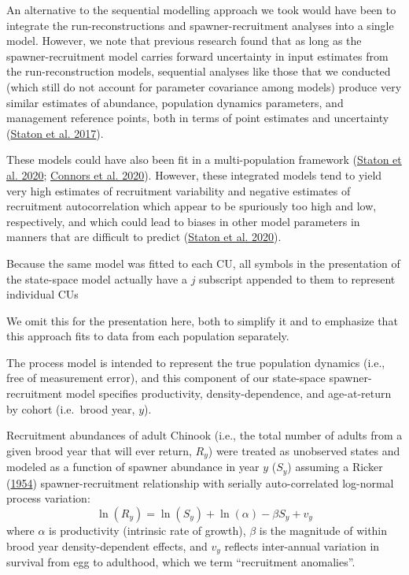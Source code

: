 \documentclass[11pt]{book}
\begin{document}
An alternative to the sequential modelling approach we took would have been to integrate the run-reconstructions and spawner-recruitment analyses into a single model. However, we note that previous research found that as long as the spawner-recruitment model carries forward uncertainty in input estimates from the run-reconstruction models, sequential analyses like those that we conducted (which still do not account for parameter covariance among models) produce very similar estimates of abundance, population dynamics parameters, and management reference points, both in terms of point estimates and uncertainty (\protect\hyperlink{ref-staton-etal-2017}{Staton et al. 2017}).

These models could have also been fit in a multi-population framework (\protect\hyperlink{ref-staton-etal-2020}{Staton et al. 2020}; \protect\hyperlink{ref-connors_incorporating_2020}{Connors et al. 2020}). However, these integrated models tend to yield very high estimates of recruitment variability and negative estimates of recruitment autocorrelation which appear to be spuriously too high and low, respectively, and which could lead to biases in other model parameters in manners that are difficult to predict (\protect\hyperlink{ref-staton-etal-2020}{Staton et al. 2020}).

Because the same model was fitted to each CU, all symbols in the presentation of the state-space model actually have a \(j\) subscript appended to them to represent individual CUs

We omit this for the presentation here, both to simplify it and to emphasize that this approach fits to data from each population separately.

\hypertarget{process-model}{%
\label{process-model}}

The process model is intended to represent the true population dynamics (i.e., free of measurement error), and this component of our state-space spawner-recruitment model specifies productivity, density-dependence, and age-at-return by cohort (i.e.~brood year, \(y\)).

Recruitment abundances of adult Chinook (i.e., the total number of adults from a given brood year that will ever return, \(R_y\)) were treated as unobserved states and modeled as a function of spawner abundance in year \(y\) (\(S_y\)) assuming a Ricker (\protect\hyperlink{ref-ricker-1954}{1954}) spawner-recruitment relationship with serially auto-correlated log-normal process variation:
\begin{equation}
  \ln(R_y) = \ln(S_y) + \ln(\alpha) - \beta S_y + v_y
  \label{eq:AR1-ricker}
\end{equation}
where \(\alpha\) is productivity (intrinsic rate of growth), \(\beta\) is the magnitude of within brood year density-dependent effects, and \(v_y\) reflects inter-annual variation in survival from egg to adulthood, which we term ``recruitment anomalies''.
\end{document}
